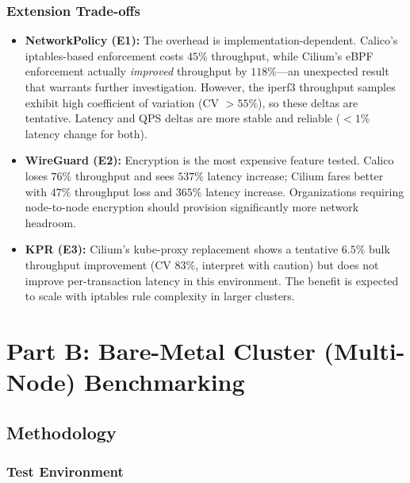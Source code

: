 \documentclass[11pt,a4paper]{article}
\begin{document}
\subsubsection{Extension Trade-offs}

\begin{itemize}
  \item \textbf{NetworkPolicy (E1):} The overhead is implementation-dependent. Calico's iptables-based enforcement costs $45\%$ throughput, while Cilium's eBPF enforcement actually \emph{improved} throughput by $118\%$---an unexpected result that warrants further investigation. However, the iperf3 throughput samples exhibit high coefficient of variation (CV $>55\%$), so these deltas are tentative. Latency and QPS deltas are more stable and reliable ($<1\%$ latency change for both).
  \item \textbf{WireGuard (E2):} Encryption is the most expensive feature tested. Calico loses $76\%$ throughput and sees $537\%$ latency increase; Cilium fares better with $47\%$ throughput loss and $365\%$ latency increase. Organizations requiring node-to-node encryption should provision significantly more network headroom.
  \item \textbf{KPR (E3):} Cilium's kube-proxy replacement shows a tentative $6.5\%$ bulk throughput improvement (CV $83\%$, interpret with caution) but does not improve per-transaction latency in this environment. The benefit is expected to scale with iptables rule complexity in larger clusters.
\end{itemize}


\newpage
\section{Part B: Bare-Metal Cluster (Multi-Node) Benchmarking}

\subsection{Methodology}

\subsubsection{Test Environment}
\end{document}

